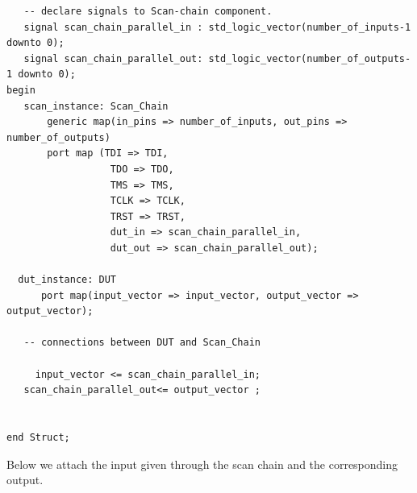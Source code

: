\documentclass[12pt]{article}
\begin{document}
\begin{verbatim}
   -- declare signals to Scan-chain component.
   signal scan_chain_parallel_in : std_logic_vector(number_of_inputs-1 downto 0);
   signal scan_chain_parallel_out: std_logic_vector(number_of_outputs-1 downto 0);
begin
   scan_instance: Scan_Chain
       generic map(in_pins => number_of_inputs, out_pins => number_of_outputs)
       port map (TDI => TDI,
                  TDO => TDO,
                  TMS => TMS,
                  TCLK => TCLK,
                  TRST => TRST,
                  dut_in => scan_chain_parallel_in,
                  dut_out => scan_chain_parallel_out);

  dut_instance: DUT 
      port map(input_vector => input_vector, output_vector => output_vector);

   -- connections between DUT and Scan_Chain

	 input_vector <= scan_chain_parallel_in;
   scan_chain_parallel_out<= output_vector ;

  
end Struct;

        \end{verbatim}
        \noindent
        Below we attach the input given through the scan chain and the corresponding output.
\end{document}
